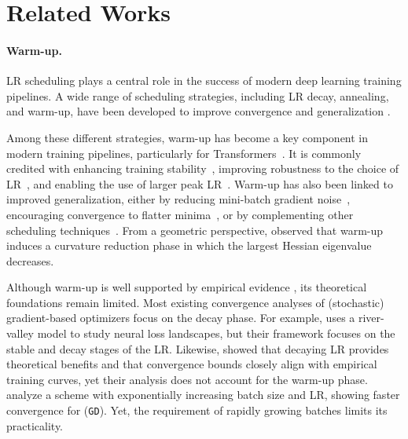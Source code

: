 \documentclass[a4paper,11pt]{article}
\newcommand{\algname}[1]{\texttt{#1}}
\newcommand{\1}{\mathbbm{1}}
\theoremstyle{plain}
\begin{document}
\section{Related Works}


\paragraph{Warm-up.}


LR scheduling plays a central role in the success of modern deep learning training pipelines. A wide range of scheduling strategies, including LR decay, annealing, and warm-up, have been developed to improve convergence and generalization \citep{mccandlish2018empirical, sutskever2013importance, touvron2023llama}.

Among these different strategies, warm-up has become a key component in modern training pipelines, particularly for Transformers~\citep{vaswani2017attention, goyal2017accurate}. It is commonly credited with enhancing training stability~\citep{kosson2024analyzing, gotmare2018closer}, improving robustness to the choice of LR~\citep{wortsman2023small}, and enabling the use of larger peak LR~\citep{kalra2024warmup}. 
Warm-up has also been linked to improved generalization, either by reducing mini-batch gradient noise~\citep{liu2019variance}, encouraging convergence to flatter minima~\citep{smith2020generalization}, or by complementing other scheduling techniques~\citep{huang2020improving, xiong2020layer, wortsman2023small}. From a geometric perspective, \citet{gilmer2021loss, roulet2024stepping} observed that warm-up induces a curvature reduction phase in which the largest Hessian eigenvalue decreases.


Although warm-up is well supported by empirical evidence \citep{vaswani2017attention, wortsman2023small, dremov2025training}, its theoretical foundations remain limited. Most existing convergence analyses of (stochastic) gradient-based optimizers focus on the decay phase. For example, \citet{wen2024understanding} uses a river-valley model to study neural loss landscapes, but their framework focuses on the stable and decay stages of the LR. Likewise, \citet{schaipp2025surprising, attia2025benefits} showed that decaying LR provides theoretical benefits and that convergence bounds closely align with empirical training curves, yet their analysis does not account for the warm-up phase.
\citet{kondo2025accelerating} analyze a scheme with exponentially increasing batch size and LR, showing faster convergence for (\algname{GD}). Yet, the requirement of rapidly growing batches limits its practicality.
\end{document}

